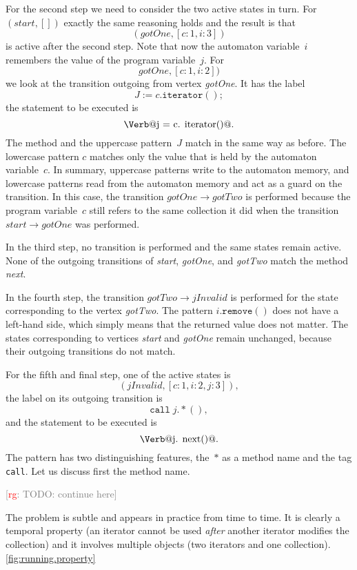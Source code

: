 \documentclass[preprint]{sigplanconf} %
\makeatletter
\newcommand{\note}[2]{\textcolor{gray}{[\textcolor{red}{#1}: #2]}}
\newcommand{\rg}[1]{\note{rg}{#1}}
\newcommand{\verbline}[2][]{\[\text{\Verb@#2@}#1\]}
\theoremstyle{definition}
\makeatother
\begin{document}
For the second step we need to consider the two active states in turn.
For $(\mathit{start},[])$ exactly the same reasoning holds and the result is that \[(\mathit{gotOne},[c:1,i:3])\] is active after the second step.
Note that now the automaton variable~$i$ remembers the value of the program variable~$j$.
For \[\mathit{gotOne},[c:1,i:2])\] we look at the transition outgoing from vertex \textit{gotOne}.
It has the label \[J:=c.\mathtt{iterator}();\]
the statement to be executed is \verbline[.]{j = c.\PY{n+na}{iterator}()}
The method and the uppercase pattern~$J$ match in the same way as before.
The lowercase pattern $c$ matches only the value that is held by the automaton variable~$c$.
In summary, uppercase patterns write to the automaton memory, and lowercase patterns read from the automaton memory and act as a guard on the transition.
In this case, the transition $\mathit{gotOne}\to\mathit{gotTwo}$ is performed because the program variable~$c$ still refers to the same collection it did when the transition $\mathit{start}\to\mathit{gotOne}$ was performed.

In the third step, no transition is performed and the same states remain active.
None of the outgoing transitions of \textit{start}, \textit{gotOne}, and \textit{gotTwo} match the method \textit{next}.

In the fourth step, the transition $\mathit{gotTwo}\to\mathit{jInvalid}$ is performed for the state corresponding to the vertex \textit{gotTwo}.
The pattern $i.\mathtt{remove}()$ does not have a left-hand side, which simply means that the returned value does not matter.
The states corresponding to vertices \textit{start} and \textit{gotOne} remain unchanged, because their outgoing transitions do not match.

For the fifth and final step, one of the active states is \[(\mathit{jInvalid},[c:1,i:2,j:3]),\] the label on its outgoing transition is \[\mathtt{call}\;j.{*}(),\] and the statement to be executed is \verbline[.]{j.\PY{n+na}{next}()}
The pattern has two distinguishing features, the~$*$ as a method name and the tag \texttt{call}.
Let us discuss first the method name.

\rg{TODO: continue here}


The problem is subtle and appears in practice from time to time.
It is clearly a temporal property (an iterator cannot be used \emph{after} another iterator modifies the collection) and it involves multiple objects (two iterators and one collection).
\autoref{fig:running.property} 
\end{document}
